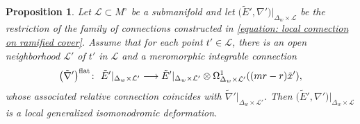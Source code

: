 \documentclass[pdftex]{sigma}
\numberwithin{equation}{section}
\newtheorem{Proposition}[Theorem]{Proposition}
\begin{document}
\begin{Proposition} \label{proposition: extendability to integrable connection in w variable}
Let ${\mathcal L}\subset M^{\circ}$ be a submanifold and
let $\big(\tilde{E}',\nabla'\big)|_{\Delta_w\times{\mathcal L}}$ be the restriction of
the family of connections constructed in \eqref{equation: local connection on ramified cover}.
Assume that for each point $t'\in{\mathcal L}$, there is an open neighborhood
${\mathcal L'}$ of $t'$ in ${\mathcal L}$ and a meromorphic integrable connection
\[
\big(\tilde{\nabla}'\big)^{\rm flat} \colon \
\tilde{E}'|_{\Delta_w\times{\mathcal L'}} \longrightarrow
\tilde{E}'|_{\Delta_w\times{\mathcal L'}} \otimes
\Omega^1_{\Delta_w\times{\mathcal L'}}((mr-r)\tilde{x}'),
\]
whose associated relative connection coincides with
$\tilde{\nabla}'|_{\Delta_w\times{\mathcal L'}}$.
Then $\big(\tilde{E}',\nabla'\big)|_{\Delta_w\times{\mathcal L}}$
is a local generalized isomonodromic deformation.
\end{Proposition}
\end{document}
